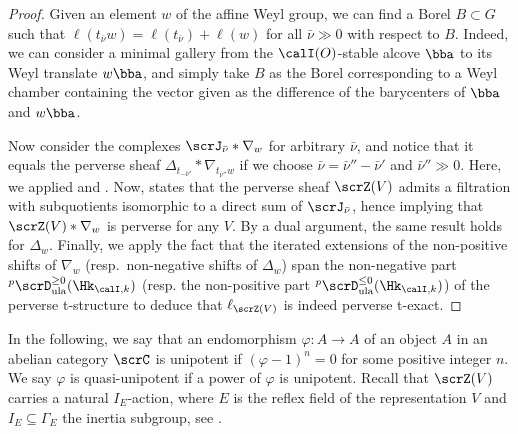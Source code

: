 \documentclass[10pt, reqno]{amsart}
\theoremstyle{plain}
\theoremstyle{definition}
\numberwithin{equation}{section}
\begin{document}
	\begin{proof}
		Given an element $w$ of the affine Weyl group, we can find a Borel $B \subset G$ such that $\ell(t_{\bar\nu} w)=\ell(t_{\bar\nu}) +\ell(w)$ for all $\bar \nu \gg 0$ with respect to $B$. Indeed, we can consider a minimal gallery from the $\calI(O)$-stable alcove $\bba$ to its Weyl translate $w\bba$, and simply take $B$ as the Borel corresponding to a Weyl chamber containing the vector given as the difference of the barycenters of $\bba$ and $w\bba$. 
		
		Now consider the complexes $\scrJ_{\bar \nu} \ast \nabla_w$ for arbitrary $\bar \nu$, and notice that it equals the perverse sheaf $\Delta_{t_{-\bar \nu'}} \ast \nabla_{t_{\bar \nu''} w}$ if we choose $\bar \nu=\bar{\nu}''-\bar{\nu}' $ and $\bar{\nu}''\gg 0$. Here, we applied  and . Now,  states that the perverse sheaf $\scrZ(V)$ admits a filtration with subquotients isomorphic to a direct sum of $\scrJ_{\bar \nu}$, hence implying that $\scrZ(V)\ast \nabla_w$ is perverse for any $V$. By a dual argument, the same result holds for $\Delta_w$. Finally, we apply the fact that the iterated extensions of the non-positive shifts of $\nabla_w$ (resp.~non-negative shifts of $\Delta_w$) span the non-negative part ${}^p\scrD_{\mathrm{ula}}^{\geq 0}(\Hk_{\calI,k})$ (resp. the non-positive part ${}^p\scrD_{\mathrm{ula}}^{\leq 0}(\Hk_{\calI,k})$) of the perverse t-structure to deduce that $\ell_{\scrZ(V)}$ is indeed perverse t-exact. 
	\end{proof}
	
	In the following, we say that an endomorphism $\varphi: A \to A$ of an object $A$ in an abelian category $\scrC$ is unipotent if $(\varphi-1)^n=0$ for some positive integer $n$. 
	We say $\varphi$ is quasi-unipotent if a power of $\varphi$ is unipotent.
	Recall that $\scrZ(V)$ carries a natural $I_E$-action, where $E$ is the reflex field of the representation $V$ and $I_E\subseteq \Gamma_E$ the inertia subgroup, see .
	
\end{document}
